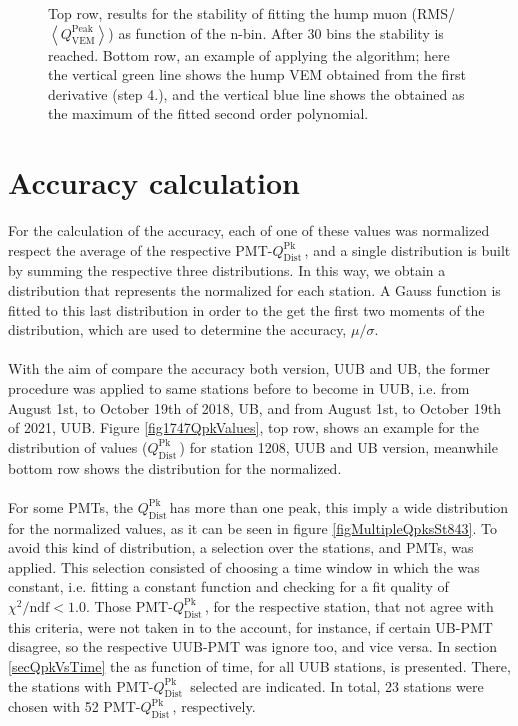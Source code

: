 \documentclass[twoside, final, 10pt]{articleMine}
\newcommand{\qpkDist}{$Q^\mathrm{Pk}_\mathrm{Dist}$\,}
\begin{document}
\begin{figure}[!t]
  \centering
  \caption{Top row, results for the stability of fitting the hump
  muon (RMS/$\left<Q^\mathrm{Peak}_\mathrm{VEM}\right>$) as
  function of the n-bin. After 30 bins the stability is reached.
  Bottom row, an example of applying the algorithm; here the
  vertical green line shows the hump VEM obtained from the first
  derivative (step 4.), and the vertical blue line shows the
  \qpkvem obtained as the maximum of the fitted second order
  polynomial.}
  \label{figApplyingAlgorithm}
\end{figure}

\section{Accuracy calculation}

For the calculation of the \qpkvem accuracy, each of one of these
values was normalized respect the average of the respective
PMT-\qpkDist, and a single distribution is built by summing the
respective three distributions. In this way, we obtain a
distribution that represents the \qpkvem normalized for each
station. A Gauss function is fitted to this last distribution in
order to the get the first two moments of the distribution, which
are used to determine the accuracy, $\mu/\sigma$.\\\\With the aim
of compare the accuracy both version, UUB and UB, the former
procedure was applied to same stations before to become in UUB,
i.e. from August 1st, to October 19th of 2018, UB, and from
August 1st, to October 19th of 2021, UUB. Figure
\ref{fig1747QpkValues}, top row, shows an example for the
distribution of \qpkvem values (\qpkDist) for station 1208, UUB
and UB version, meanwhile bottom row shows the distribution for
the \qpkvem normalized.\\\\For some PMTs, the \qpkDist has more
than one peak, this imply a wide distribution for the normalized
values, as it can be seen in figure \ref{figMultipleQpksSt843}.
To avoid this kind of distribution, a selection over the
stations, and PMTs, was applied. This selection consisted of
choosing a time window in which the \qpkvem was constant, i.e.
fitting a constant function and checking for a fit quality of
$\chi^2/\mathrm{ndf}<1.0$. Those PMT-\qpkDist, for the respective
station, that not agree with this criteria, were not taken in to
the account, for instance, if certain UB-PMT disagree, so the
respective UUB-PMT was ignore too, and vice versa. In section
\ref{secQpkVsTime} the \qpkvem as function of time, for all UUB
stations, is presented. There, the stations with PMT-\qpkDist
selected are indicated. In total, 23 stations were chosen with 52
PMT-\qpkDist, respectively.
\clearpage
\end{document}
